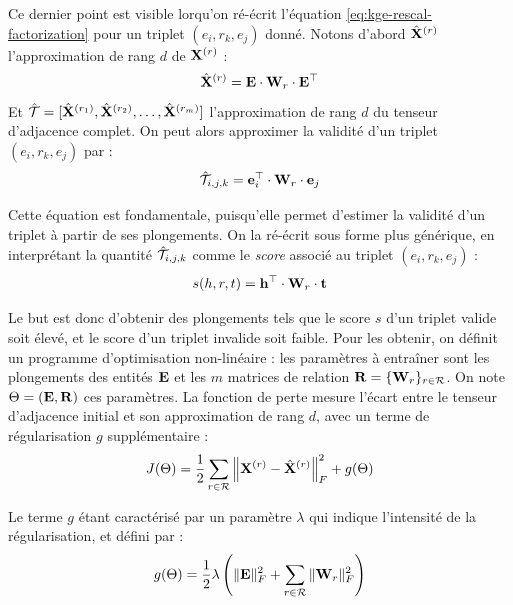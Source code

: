 Ce dernier point est visible lorqu'on ré-écrit l'équation \ref{eq:kge-rescal-factorization} pour un triplet $(e_i, r_k, e_j)$ donné. Notons d'abord $\hat{\bf{X}}^{(r)}$ l'approximation de rang $d$ de $\bf{X}^{(r)}$ :
\begin{equation*}
    \hat{\bf{X}}^{(r)} = \bf{E} \cdot \bf{W}_r \cdot \bf{E}^\top
\end{equation*}
Et $\hat{\cal{T}} = [\hat{\bf{X}}^{(r_1)}, \hat{\bf{X}}^{(r_2)}, \ldots, \hat{\bf{X}}^{(r_m)}]$ l'approximation de rang $d$ du tenseur d'adjacence complet. On peut alors approximer la validité d'un triplet $(e_i, r_k, e_j)$ par :
\begin{equation}
    \hat{\cal{T}}_{i, j, k} = \bf{e}_i^\top \cdot \bf{W}_r \cdot \bf{e}_j
\end{equation}

Cette équation est fondamentale, puisqu'elle permet d'estimer la validité d'un triplet à partir de ses plongements. On la ré-écrit sous forme plus générique, en interprétant la quantité $\hat{\cal{T}}_{i, j, k}$ comme le \textit{score} associé au triplet $(e_i, r_k, e_j)$ : 
\begin{equation}
    s(h, r, t) = \mathbf{h}^\top \cdot \bf{W}_r \cdot \bf{t}
    \label{eq:rescal}
\end{equation}

Le but est donc d'obtenir des plongements tels que le score $s$ d'un triplet valide soit élevé, et le score d'un triplet invalide soit faible. Pour les obtenir, on définit un programme d'optimisation non-linéaire : les paramètres à entraîner sont les plongements des entités $\bf{E}$ et les $m$ matrices de relation $\bf{R} = \{ \bf{W}_r \}_{r \in \Rel}$. On note $\Theta = (\bf{E}, \bf{R})$ ces paramètres. La fonction de perte mesure l'écart entre le tenseur d'adjacence initial et son approximation de rang $d$, avec un terme de régularisation $g$ supplémentaire :
\begin{equation}
    J(\Theta) = \frac{1}{2} \sum_{r \in \Rel} \left\| \bf{X}^{(r)} - \hat{\bf{X}}^{(r)} \right\|_F^2 + g(\Theta)
    \label{eq:kge-rescal-loss-function}
\end{equation}

Le terme $g$ étant caractérisé par un paramètre $\lambda$ qui indique l'intensité de la régularisation, et défini par :
\begin{equation}
    g(\Theta) = \frac{1}{2} \lambda \left( \| \bf{E} \|_F^2 + \sum_{r \in \Rel} \| \bf{W}_r \|_F^2 \right)
\end{equation}


